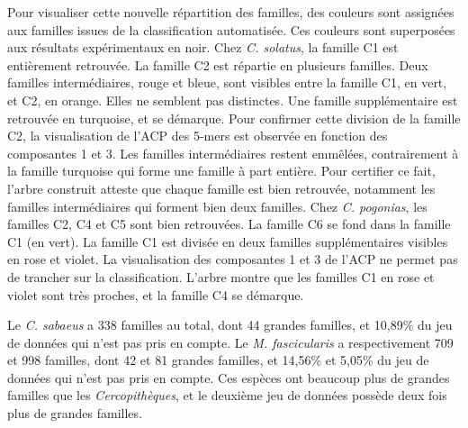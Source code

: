 \documentclass[12pt,a4paper]{article}
\begin{document}
			
			Pour visualiser cette nouvelle répartition des familles, des couleurs sont assignées aux familles issues de la classification automatisée. Ces couleurs sont superposées aux résultats expérimentaux en noir.  Chez \textit{C. solatus}, la famille C1 est entièrement retrouvée. La famille C2 est répartie en plusieurs familles. Deux familles intermédiaires, rouge et bleue, sont visibles entre la famille C1, en vert, et C2, en orange. Elles ne semblent pas distinctes.  Une famille supplémentaire est retrouvée en turquoise, et se démarque. Pour confirmer cette division de la famille C2, la visualisation de l'ACP des 5-mers est observée en fonction des composantes 1 et 3. Les familles intermédiaires restent emmêlées, contrairement à la famille turquoise qui forme une famille à part entière. Pour certifier ce fait, l'arbre construit atteste que chaque famille est bien retrouvée, notamment les familles intermédiaires qui forment bien deux familles. Chez \textit{C. pogonias}, les familles C2, C4 et C5 sont bien retrouvées. La famille C6 se fond dans la famille C1 (en vert). La famille C1 est divisée en deux familles supplémentaires visibles en rose et violet. La visualisation des composantes 1 et 3 de l'ACP ne permet pas de trancher sur la classification. L'arbre montre que les familles C1 en rose et violet sont très proches, et la famille C4 se démarque.  
			 

			 Le \textit{C. sabaeus} a 338 familles au total, dont 44 grandes familles, et 10,89\% du jeu de données qui n'est pas pris en compte. Le \textit{M. fascicularis} a respectivement 709 et 998 familles, dont 42 et 81 grandes familles, et 14,56\% et 5,05\% du jeu de données qui n'est pas pris en compte. Ces espèces ont beaucoup plus de grandes familles que les \textit{Cercopithèques}, et le deuxième jeu de données possède deux fois plus de grandes familles.
			 
\end{document}

